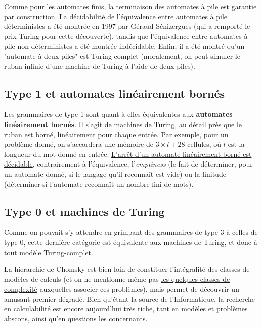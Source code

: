 Comme pour les automates finis, la terminaison des automates à pile est garantie par construction. La décidabilité de l'équivalence entre automates à pile déterministes a été montrée en 1997 par Géraud Sénizergues (qui a remporté le prix Turing pour cette découverte), tandis que l'équivalence entre automates à pile non-déterministes a été montrée indécidable. Enfin, il a été montré qu'un "automate à deux piles" est Turing-complet (moralement, on peut simuler le ruban infinie d'une machine de Turing à l'aide de deux piles). 

\subsection{Type 1 et automates linéairement bornés}

Les grammaires de type 1 sont quant à elles équivalentes aux \textbf{automates linéairement bornés}. Il s'agit de machines de Turing, au détail près que le ruban est borné, linéairement pour chaque entrée. Par exemple, pour un problème donné, on s'accordera une mémoire de $3 \times l + 28$ cellules, où $l$ est la longueur du mot donné en entrée.
\href{https://cs.stackexchange.com/questions/22925/why-is-the-halting-problem-decidable-for-lba}{L'arrêt d'un automate linéairement borné est décidable}, contrairement à l'équivalence, l'\textit{emptiness} (le fait de déterminer, pour un automate donné, si le langage qu'il reconnaît est vide) ou la finitude (déterminer si l'automate reconnaît un nombre fini de mots).

\subsection{Type 0 et machines de Turing}

Comme on pouvait s'y attendre en grimpant des grammaires de type 3 à celles de type 0, cette dernière catégorie est équivalente aux machines de Turing, et donc à tout modèle Turing-complet. 

La hierarchie de Chomsky est bien loin de constituer l'intégralité des classes de modèles de calculs (et on ne mentionne même pas \href{https://www.math.ucdavis.edu/~greg/zoology/diagram.pdf}{les quelques classes de complexité} auxquelles associer ces problèmes), mais permet de découvrir un amusant premier dégradé. Bien qu'étant la source de l'Informatique, la recherche en calculabilité est encore aujourd'hui très riche, tant en modèles et problèmes abscons, ainsi qu'en questions les concernants.